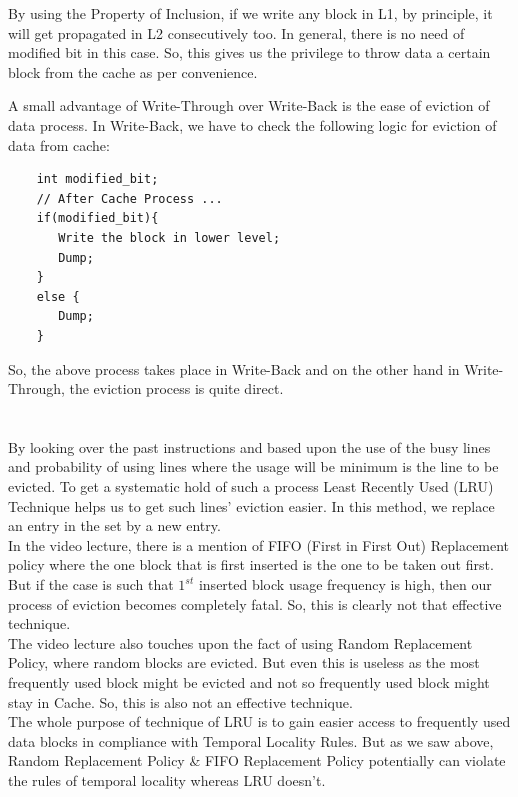 \documentclass[12pt]{article}
\begin{document}
By using the Property of Inclusion, if we write any block in L1, by principle, it will get propagated in L2 consecutively too. In general, there is no need of modified bit in this case. So, this gives us the privilege to throw data a certain block from the cache as per convenience. 

A small advantage of Write-Through over Write-Back is the ease of eviction of data process. In Write-Back, we have to check the following logic for eviction of data from cache:
\begin{verbatim}
    int modified_bit;
    // After Cache Process ...
    if(modified_bit){
       Write the block in lower level;
       Dump;
    }
    else {
       Dump;
    }
\end{verbatim}

So, the above process takes place in Write-Back and on the other hand in Write-Through, the eviction process is quite direct.

\section{}
By looking over the past instructions and based upon the use of the busy lines and probability of using lines where the usage will be minimum is the line to be evicted. To get a systematic hold of such a process Least Recently Used (LRU) Technique helps us to get such lines' eviction easier. In this method, we replace an entry in the set by a new entry. \\

In the video lecture, there is a mention of FIFO (First in First Out) Replacement policy where the one block that is first inserted is the one to be taken out first. But if the case is such that $1^{st}$ inserted block usage frequency is high, then our process of eviction becomes completely fatal. So, this is clearly not that effective technique. \\

The video lecture also touches upon the fact of using Random Replacement Policy, where random blocks are evicted. But even this is useless as the most frequently used block might be evicted and not so frequently used block might stay in Cache. So, this is also not an effective technique. \\

The whole purpose of technique of LRU is to gain easier access to frequently used data blocks in compliance with Temporal Locality Rules. But as we saw above, Random Replacement Policy \& FIFO Replacement Policy potentially can violate the rules of temporal locality whereas LRU doesn't. \\
\end{document}
